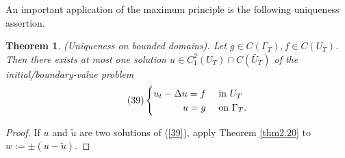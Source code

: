 \documentclass[hyperref,UTF8,12pt]{article}
\numberwithin{equation}{subsection}
\theoremstyle{plain}
\newtheorem{theorem}{Theorem}
\theoremstyle{definition}
\numberwithin{theorem}{section}
\numberwithin{lemma}{section}
\numberwithin{proposition}{section}
\numberwithin{remark}{section}
\numberwithin{corollary}{section}
\numberwithin{definition}{section}
\numberwithin{problem}{section}
\numberwithin{example}{section}
\begin{document}
An important application of the maximum principle is the following uniqueness assertion.
\begin{theorem}\label{thm2.21}
(Uniqueness on bounded domains). Let $g\in C(\Gamma_T),f \in C(U_T)$. Then there exists at most one solution $u \in C_1^2(U_T)\cap C(\bar{U}_T)$ of the initial/boundary-value problem\[\tag{39}\label{39}\begin{cases}
	\hfill u_t-\Delta u=f&\text{ in } U_T\\
	\hfill u=g&\text{ on } \Gamma_T.
\end{cases}\]
\end{theorem}
\begin{proof}
If $u$ and $\tilde{u}$ are two solutions of (\ref{39}), apply Theorem \ref{thm2.20} to $w:=\pm(u-\tilde{u})$.
\end{proof}
\end{document}
